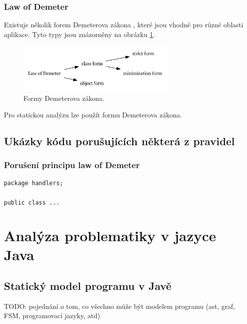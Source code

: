 \subsubsection{Law of Demeter}

Existuje několik forem Demeterova zákona \cite{35588}, které jsou vhodné pro různé oblasti aplikace. Tyto typy jsou znázorněny na obrázku \ref{demeter_law_types}.

\begin{figure}[h!]
  \centering
  \includegraphics[width=0.7\textwidth]{./graphs/demeter_law_types.png}
  \caption{Formy Demeterova zákona.\label{demeter_law_types}}
\end{figure}

Pro statickou analýzu lze použít  formu Demeterova zákona.

\subsection{Ukázky kódu porušujících některá z pravidel}

\subsubsection{Porušení principu law of Demeter}

\begin{verbatim}
package handlers;

public class ...

\end{verbatim}

\section{Analýza problematiky v jazyce Java}

\subsection{Statický model programu v Javě}
TODO: pojednání o tom, co všechno může být modelem programu (ast, graf, FSM, programovací jazyky, atd)


